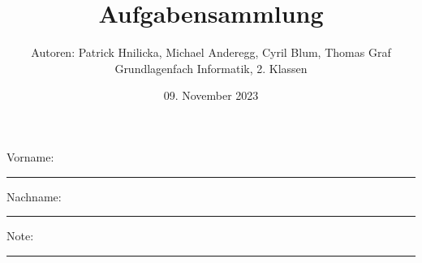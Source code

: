 \newtoggle{withbonus} \toggletrue{withbonus} %

\newcommand{\mycourse}{Grundlagenfach Informatik}
\newcommand{\myclass}{2. Klassen}
\newcommand{\mydate}{09. November 2023}

\title{\textbf{Aufgabensammlung}}
\author{Autoren: Patrick Hnilicka, Michael Anderegg, Cyril Blum, Thomas Graf\\
\mycourse, \myclass}
\date{\mydate}
\maketitle
\thispagestyle{headandfoot}		

\begin{center}
\end{center}
\vspace{10mm}

\begin{center}
	Vorname: \rule{45mm}{0.8pt}\qquad Nachname: \rule{45mm}{0.8pt}
\end{center}
\vspace{20mm}

\begin{center}
	\iftoggle{withbonus} {
		\combinedgradetable[h][questions]
	} {
		\gradetable[h][questions]
	}
\end{center}
\vspace{15mm}
\begin{center}
	Note: 
	\vspace{10mm}
	
	\rule{8mm}{1.2pt}
\end{center}
\clearpage

